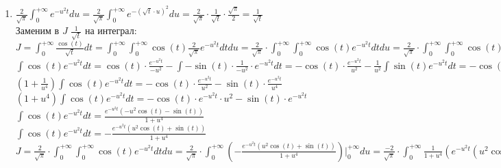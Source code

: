 \begin{enumerate}
    \item $\displaystyle \frac{2}{\sqrt{\pi}} \int_0^{+\infty} e^{-u^2t} du =
        \frac{2}{\sqrt{\pi}} \int_0^{+\infty} e^{-(\sqrt{t} \cdot u)^2} du =
        \frac{2}{\sqrt{\pi}} \cdot \frac{1}{\sqrt{t}} \cdot \frac{\sqrt{\pi}}{2} =
        \frac{1}{\sqrt{t}}$ \\
        Заменим в $J$ $\frac{1}{\sqrt{t}}$ на интеграл: \\
        $\displaystyle J = \int_0^{+\infty} \frac{\cos(t)}{\sqrt{t}} dt =
            \int_0^{+\infty} \int_0^{+\infty} \cos(t) \frac{2}{\sqrt{\pi}} e^{-u^2t} dtdu =
            \frac{2}{\sqrt{\pi}} \cdot \int_0^{+\infty} \int_0^{+\infty} \cos(t) e^{-u^2t} dtdu =
            \frac{2}{\sqrt{\pi}} \cdot \int_0^{+\infty} \int_0^{+\infty} \cos(t) e^{-u^2t} dtdu $ \\
        $\int \cos(t) e^{-u^2t} dt = 
            \cos(t) \cdot \frac{e^{-u^2t}}{-u^2} - \int -\sin(t) \cdot \frac{1}{-u^2} \cdot e^{-u^2t} dt = 
            -\cos(t) \cdot \frac{e^{-u^2t}}{u^2} - \frac{1}{u^2} \int \sin(t) e^{-u^2t} dt = 
            -\cos(t) \cdot \frac{e^{-u^2t}}{u^2} - \frac{1}{u^2} (\sin(t) \cdot \frac{e^{-u^2t}}{u^2} - \int \cos(t) \cdot \frac{1}{-u^2} \cdot e^{-u^2t} dt) = 
            -\cos(t) \cdot \frac{e^{-u^2t}}{u^2} - \frac{1}{u^2} (\sin(t) \cdot \frac{e^{-u^2t}}{u^2} + \frac{1}{u^2} \int \cos(t) e^{-u^2t} dt) = 
            -\cos(t) \cdot \frac{e^{-u^2t}}{u^2} - \sin(t) \cdot \frac{e^{-u^2t}}{u^4} - \frac{1}{u^4} \int \cos(t) e^{-u^2t} dt) = 
        $ \\
        $\displaystyle (1 + \frac{1}{u^4}) \int \cos(t) e^{-u^2t} dt = -\cos(t) \cdot \frac{e^{-u^2t}}{u^2} - \sin(t) \cdot \frac{e^{-u^2t}}{u^4}$ \\
        $\displaystyle (1 + u^4) \int \cos(t) e^{-u^2t} dt = -\cos(t) \cdot e^{-u^2t} \cdot u^2 - \sin(t) \cdot e^{-u^2t}$ \\
        $\displaystyle \int \cos(t) e^{-u^2t} dt = \frac{e^{-u^2t}(-u^2\cos(t) - \sin(t))}{1 + u^4}$ \\
        $\displaystyle \int \cos(t) e^{-u^2t} dt = -\frac{e^{-u^2t}(u^2\cos(t) + \sin(t))}{1 + u^4}$ \\
        $\displaystyle J = \frac{2}{\sqrt{\pi}} \cdot \int_0^{+\infty} \int_0^{+\infty} \cos(t) e^{-u^2t} dtdu =
            \frac{2}{\sqrt{\pi}} \cdot \int_0^{+\infty} (-\frac{e^{-u^2t}(u^2\cos(t) + \sin(t))}{1 + u^4})\Big|_0^{+\infty} du =
            \frac{-2}{\sqrt{\pi}} \cdot \int_0^{+\infty} \frac{1}{1 + u^4} (e^{-u^2t}(u^2\cos(t) + \sin(t)))\Big|_0^{+\infty} du $ \\

\end{enumerate}
